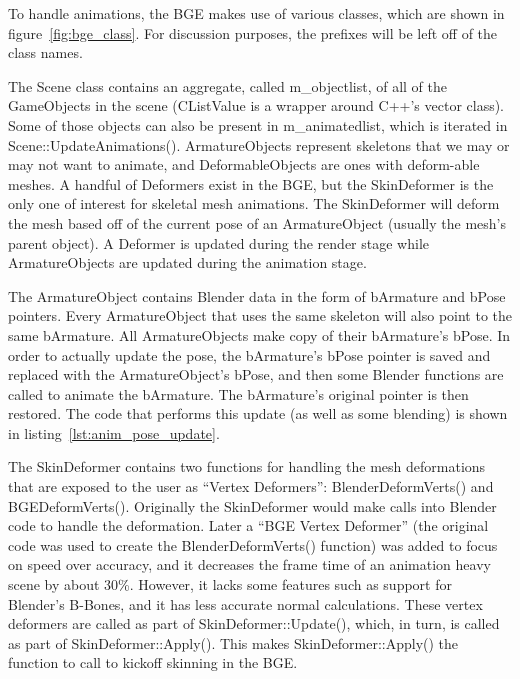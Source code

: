 To handle animations, the BGE makes use of various classes, which are shown in figure~\ref{fig:bge_class}.
For discussion purposes, the prefixes will be left off of the class names.


The Scene class contains an aggregate, called m\_objectlist, of all of the GameObjects in the scene (CListValue is a wrapper around C++'s vector class).
Some of those objects can also be present in m\_animatedlist, which is iterated in Scene::UpdateAnimations().
ArmatureObjects represent skeletons that we may or may not want to animate, and DeformableObjects are ones with deform-able meshes.
A handful of Deformers exist in the BGE, but the SkinDeformer is the only one of interest for skeletal mesh animations.
The SkinDeformer will deform the mesh based off of the current pose of an ArmatureObject (usually the mesh's parent object).
A Deformer is updated during the render stage while ArmatureObjects are updated during the animation stage.

The ArmatureObject contains Blender data in the form of bArmature and bPose pointers.
Every ArmatureObject that uses the same skeleton will also point to the same bArmature.
All ArmatureObjects make copy of their bArmature's bPose.
In order to actually update the pose, the bArmature's bPose pointer is saved and replaced with the ArmatureObject's bPose, and then some Blender functions are called to animate the bArmature.
The bArmature's original pointer is then restored.
The code that performs this update (as well as some blending) is shown in listing~\ref{lst:anim_pose_update}.


The SkinDeformer contains two functions for handling the mesh deformations that are exposed to the user as ``Vertex Deformers'': BlenderDeformVerts() and BGEDeformVerts().
Originally the SkinDeformer would make calls into Blender code to handle the deformation.
Later a ``BGE Vertex Deformer'' (the original code was used to create the BlenderDeformVerts() function) was added to focus on speed over accuracy, and it decreases the frame time of an animation heavy scene by about 30\%.
However, it lacks some features such as support for Blender's B-Bones, and it has less accurate normal calculations.
These vertex deformers are called as part of SkinDeformer::Update(), which, in turn, is called as part of SkinDeformer::Apply().
This makes SkinDeformer::Apply() the function to call to kickoff skinning in the BGE.

